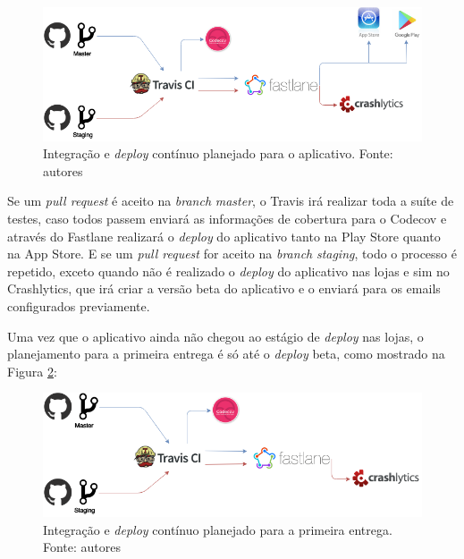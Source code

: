 \begin{figure}[H]
    \centering
    \includegraphics[scale=0.5]{figuras/ci_should_be.png}
    \caption[Integração e \textit{deploy} contínuo planejado para o aplicativo]{Integração e \textit{deploy} contínuo planejado para o aplicativo. Fonte: autores}
    \label{img:integracao_deploy_continuo_planejado_app}
\end{figure}

Se um \textit{pull request} é aceito na \textit{branch} \textit{master}, o Travis irá realizar toda a suíte de testes, caso todos passem enviará as informações de cobertura para o
Codecov e através do Fastlane realizará o \textit{deploy} do aplicativo tanto na Play Store quanto na App Store. E se um \textit{pull request} for aceito na \textit{branch} \textit{staging}, todo o processo é repetido, exceto quando não é realizado o \textit{deploy} do aplicativo nas lojas e sim no Crashlytics, que irá criar a versão beta do aplicativo e o enviará para os emails configurados previamente.

Uma vez que o aplicativo ainda não chegou ao estágio de \textit{deploy} nas lojas, o planejamento para a primeira entrega é só até o \textit{deploy} beta, como mostrado na Figura \ref{img:integracao_deploy_continuo_planejado_primeira_entrega}:

\begin{figure}[H]
    \centering
    \includegraphics[scale=0.5]{figuras/ci_as_is.png}
    \caption[Integração e \textit{deploy} contínuo planejado para a primeira entrega]{Integração e \textit{deploy} contínuo planejado para a primeira entrega. Fonte: autores}
    \label{img:integracao_deploy_continuo_planejado_primeira_entrega}
\end{figure}

